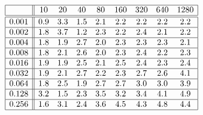 \[
\begin{array}{|c||cccccccc|}
\hline 
& 10 & 20 & 40 & 80 & 160 & 320 & 640 & 1280\\
\hline \hline 
0.001 & 0.9 & 3.3 & 1.5 & 2.1 & 2.2 & 2.2 & 2.2 & 2.2 \\ \hline 
0.002 & 1.8 & 3.7 & 1.2 & 2.3 & 2.2 & 2.4 & 2.1 & 2.2 \\ \hline 
0.004 & 1.8 & 1.9 & 2.7 & 2.0 & 2.3 & 2.3 & 2.3 & 2.1 \\ \hline 
0.008 & 1.8 & 2.1 & 2.6 & 2.0 & 2.3 & 2.4 & 2.2 & 2.3 \\ \hline 
0.016 & 1.9 & 1.9 & 2.5 & 2.1 & 2.5 & 2.4 & 2.3 & 2.4 \\ \hline 
0.032 & 1.9 & 2.1 & 2.7 & 2.2 & 2.3 & 2.7 & 2.6 & 4.1 \\ \hline 
0.064 & 1.8 & 2.5 & 1.9 & 2.7 & 2.7 & 3.0 & 3.0 & 3.9 \\ \hline 
0.128 & 3.2 & 1.5 & 2.3 & 3.5 & 3.2 & 3.4 & 4.1 & 4.9 \\ \hline 
0.256 & 1.6 & 3.1 & 2.4 & 3.6 & 4.5 & 4.3 & 4.8 & 4.4 \\ \hline 
\end{array}
\]

